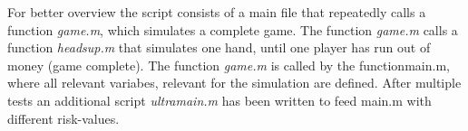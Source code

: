 \documentclass[11pt]{article}
\begin{document}
\begin{minipage}{0.48\textwidth}
For better overview the script consists of a main file that repeatedly calls a function \textit{game.m}, which simulates a complete game. The function \textit{game.m} calls a function \textit{headsup.m} that simulates one hand, until one player has run out of money (game complete). The function \textit{game.m} is called by the function{main.m}, where all relevant variabes, relevant for the simulation are defined.
After multiple tests an additional script \textit{ultramain.m} has been written to feed {main.m} with different risk-values.\\
\end{minipage}



\begin{figure}[htbp]
	\hfill
	\begin{minipage}{0.48\textwidth}

\end{minipage}
\end{figure}
\end{document}
